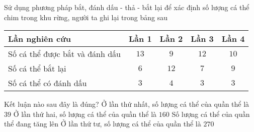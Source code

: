 \begin{ex}
	Sử dụng phương pháp bắt, đánh dấu - thả - bắt lại để xác định số lượng cá thể chim trong khu rừng, người ta ghi lại trong bảng sau
	\begin{center}
		\begin{tabular}{|l|c|c|c|c|}
		\hline 
		Lần nghiên cứu & Lần 1 & Lần 2 & Lần 3 & Lần 4\\
		\hline 
		Số cá thể được bắt và đánh dấu & $13$ & $9$ & $12$ & $10$\\
		\hline 
		Số cá thể bắt lại & $6$ & $12$ & $7$ & $9$ \\
		\hline 
		Số cá thể có đánh dấu & $3$ & $4$ & $3$ & $3$\\
		\hline 
		\end{tabular}
	\end{center}
Kết luận nào sau đây là đúng?
	\choice
	{Ở lần thứ nhất, số lượng cá thể của quần thể là $ 39 $}
	{Ở lần thứ hai, số lượng cá thể của quần thể là $160 $}
	{\True Số lượng cá thể của quần thể đang tăng lên}
	{Ở lần thứ tư, số lượng cá thể của quần thể là $270 $}
\end{ex}

